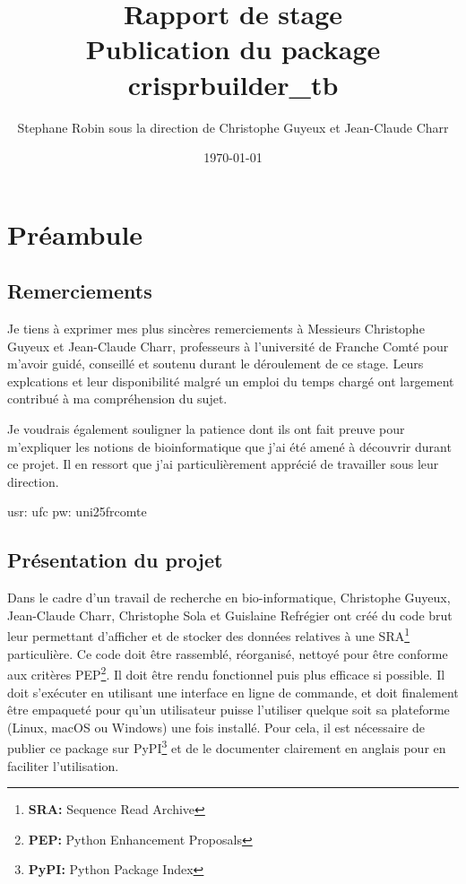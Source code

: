 \documentclass[twoside,a4paper,11pt,frenchb,openany]{report}
\title{\textbf{Rapport de stage \\ Publication du package crisprbuilder\_tb}}
\author{Stephane Robin sous la direction de Christophe Guyeux et Jean-Claude Charr}
\date{\today}
\begin{document}
	
\maketitle



\tableofcontents



\chapter{Préambule}


	
\section{Remerciements}
	
Je tiens à exprimer mes plus sincères remerciements à Messieurs Christophe Guyeux et Jean-Claude Charr, professeurs à l'université de Franche Comté pour m'avoir guidé, conseillé et soutenu durant le déroulement de ce stage. Leurs explcations et leur disponibilité malgré un emploi du temps chargé ont largement contribué à ma compréhension du sujet.

Je voudrais également souligner la patience dont ils ont fait preuve pour m'expliquer les notions de bioinformatique que j'ai été amené à découvrir durant ce projet. Il en ressort que j'ai particulièrement apprécié de travailler sous leur direction.

usr: ufc
pw: uni25frcomte

\section{Présentation du projet}

Dans le cadre d'un travail de recherche en bio-informatique, Christophe Guyeux, Jean-Claude Charr, Christophe Sola et Guislaine Refrégier ont créé du code brut leur permettant d'afficher et de stocker des données relatives à une SRA\footnote{\textbf{SRA:} Sequence Read Archive} particulière. Ce code doit être rassemblé, réorganisé, nettoyé pour être conforme aux critères PEP\footnote{\textbf{PEP:} Python Enhancement Proposals}. Il doit être rendu fonctionnel puis plus efficace si possible. Il doit s'exécuter en utilisant une interface en ligne de commande, et doit finalement être empaqueté pour qu'un utilisateur puisse l'utiliser quelque soit sa plateforme (Linux, macOS ou Windows) une fois installé. Pour cela, il est nécessaire de publier ce package sur PyPI\footnote{\textbf{PyPI:} Python Package Index} et de le documenter clairement en anglais pour en faciliter l'utilisation.
\end{document}
